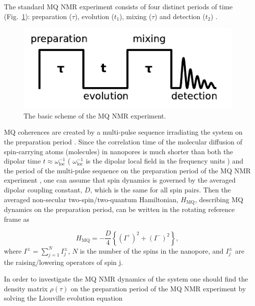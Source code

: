 \documentclass[
    pra,  
    twocolumn, 
    floatfix, 
    amsmath, 
    amssymb, 
    superscriptaddress
]{revtex4-1}
\begin{document}
The standard MQ NMR experiment consists of four distinct periods of time (Fig.~\ref{fig:experiment}): preparation ($\tau$), evolution ($t_1$), mixing ($\tau$) and detection ($t_2$) \cite{mq_nmr_experiment}.
\begin{figure}
    \centering
    \includegraphics[width=\linewidth]{experiment.pdf}
    \caption{The basic scheme of the MQ NMR experiment.}
    \label{fig:experiment}
\end{figure}
MQ coherences are created by a multi-pulse sequence irradiating the system on the preparation period \cite{mq_nmr_experiment}. Since the correlation time of the molecular diffusion of spin-carrying atoms (molecules) in nanopores is much shorter than both the dipolar time $t \approx \omega^{-1}_{\mathrm{loc}}$ ( $\omega^{-1}_{\mathrm{loc}}$  is the dipolar local field in the frequency units \cite{Goldman}) and  the period of the multi-pulse sequence on the preparation period of the MQ NMR experiment \cite{mq_nmr_experiment}, one can assume that spin dynamics is governed by the averaged dipolar coupling constant, $D$, which is the same for all spin pairs. Then the averaged non-secular two-spin/two-quantum Hamiltonian, $H_\mathrm{MQ}$, describing MQ dynamics on the preparation period, can be written in the rotating reference frame \cite{Goldman} as \cite{lab:mq_nmr_dyn_in_nanopores_2009}

\begin{equation}
    \label{eq:ham_mq}
    H_\mathrm{MQ}  = - \frac D 4 \left\{(I^+)^2 + (I^-)^2\right\},
\end{equation}
where  $I^{\pm} = \sum\limits_{j=1}^N I^{\pm}_j$, $N$ is the number of the spins in the nanopore, and $I^{\pm}_j$ are the raising/lowering operators of spin j.

In order to investigate the MQ NMR dynamics of the system one should find the density matrix $\rho(\tau)$ on the preparation period of the MQ NMR experiment \cite{mq_nmr_experiment} by solving the Liouville evolution equation \cite{lab:mq_mnr_qinfo_2012}
\end{document}

